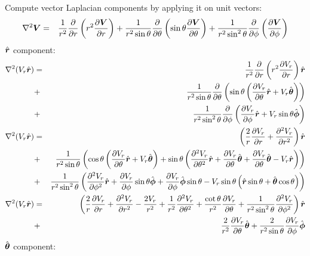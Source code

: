 Compute vector Laplacian components by applying it on unit vectors:
\begin{eqnarray}
\Laplacian \bV &=& \frac{1}{r^2}\deriv{}{r}\left(r^2 \deriv{\bV}{r}\right) +
\frac{1}{r^2\sin\theta}\deriv{}{\theta}\left(\sin\theta\deriv{\bV}{\theta}\right)+
\frac{1}{r^2 \sin^2\theta}\deriv{}{\phi}\left(\deriv{\bV}{\phi}\right)
\end{eqnarray}
$\brhat$ component:
\begin{eqnarray}
\Laplacian (V_r\brhat) &=&
\frac{1}{r^2}\deriv{}{r}\left(r^2 \deriv{V_r}{r}\right)\brhat
\\ &+&
\frac{1}{r^2\sin\theta}\deriv{}{\theta}\left(
\sin\theta\left(\deriv{V_r}{\theta}\brhat + V_r\bthetahat \right)\right)
\\ &+&
\frac{1}{r^2 \sin^2\theta}\deriv{}{\phi}\left(
\deriv{V_r}{\phi}\brhat + V_r \sin\theta\bphihat
\right) \\
\Laplacian (V_r\brhat) &=&
\left(
\frac{2}{r}\deriv{V_r}{r}+\deriv{^2V_r}{r^2}\right)\brhat
\\ &+&
\frac{1}{r^2\sin\theta}\left(
\cos\theta\left(\deriv{V_r}{\theta}\brhat + V_r\bthetahat \right) +
\sin\theta\left(\deriv{^2V_r}{\theta^2}\brhat + \deriv{V_r}{\theta}\bthetahat + \deriv{V_r}{\theta}\bthetahat - V_r\brhat\right)
\right)
\\ &+&
\frac{1}{r^2 \sin^2\theta}\left(
\deriv{^2V_r}{\phi^2}\brhat + \deriv{V_r}{\phi} \sin\theta\bphihat +
\deriv{V_r}{\phi}\bphihat\sin\theta - V_r \sin\theta
\left(\brhat \sin\theta + \bthetahat \cos\theta \right)
\right)
\\
\Laplacian (V_r\brhat) &=&
\left(
\frac{2}{r}\deriv{V_r}{r}+\deriv{^2V_r}{r^2}-\frac{2V_r}{r^2}
+ \frac{1}{r^2}\deriv{^2V_r}{\theta^2}
+ \frac{\cot\theta}{r^2} \deriv{V_r}{\theta}
+ \frac{1}{r^2 \sin^2\theta} \deriv{^2V_r}{\phi^2}
\right)\brhat
\\ &+& \frac{2}{r^2} \deriv{V_r}{\theta} \bthetahat + \frac{2}{r^2 \sin\theta}\deriv{V_r}{\phi} \bphihat
\end{eqnarray}
$\bthetahat$ component:
